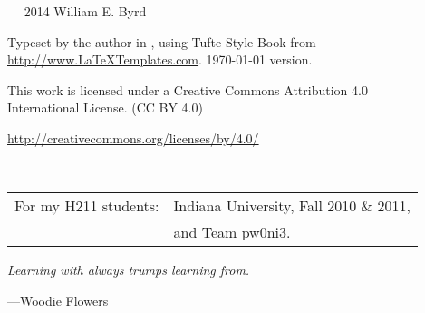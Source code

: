 \documentclass{tufte-book} %
\newcommand{\blankpage}{\newpage\hbox{}\thispagestyle{empty}\newpage} %
\begin{document}
\begin{schemeregion}

\frontmatter
{} %



\blankpage




\newpage

\begin{fullwidth}
~\vfill
\thispagestyle{empty}
\setlength{\parindent}{0pt}
\setlength{\parskip}{\baselineskip}
\large
\noindent
\textcopyright~2014 William E. Byrd

\noindent
Typeset by the author in \XeLaTeX, using Tufte-Style Book from \url{http://www.LaTeXTemplates.com}. \today\xspace version.

\huge
\noindent
\ccLogo
\ccAttribution

\large
\noindent
This work is licensed under a Creative Commons Attribution 4.0\\International License.
(CC BY 4.0)

\noindent
\url{http://creativecommons.org/licenses/by/4.0/}
\normalsize
\end{fullwidth}



\cleardoublepage
\thispagestyle{empty}
\begin{fullwidth}
~\vfill
\begin{doublespace}
\noindent\fontsize{18}{22}\selectfont\itshape
\nohyphenation
\begin{tabular}{ll}
For my H211 students: & Indiana University, Fall 2010 \& 2011, \\ 
& and Team pw0ni3.
\end{tabular}
\end{doublespace}
\begin{flushright}
\Large
\textit{Learning with always trumps learning from.}

\wspace

---Woodie Flowers
\normalsize
\end{flushright}
\vfill
\vfill
\end{fullwidth}



\end{schemeregion}
\end{document}
